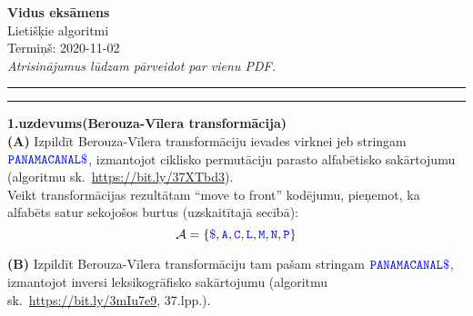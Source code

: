 \documentclass[a4paper,12pt]{article}
\begin{document}
\begin{center}
{\bf\Huge Vidus eksāmens} \\[5pt]
Lietišķie algoritmi \\
Termiņš: 2020-11-02\\[5pt]
{\em Atrisinājumus lūdzam pārveidot par vienu PDF.}
\end{center}

\hrule
\vspace{2pt}
\hrule
\vspace{12pt}



\vspace{10pt}
{\bf 1.uzdevums(Berouza-Vīlera trans\-for\-mā\-ci\-ja)}\\
{\bf (A)} Izpildīt Berouza-Vīlera transformāciju ie\-va\-des virknei jeb stringam
$\textcolor{blue}{\mathtt{PANAMACANAL\$}}$, izmantojot 
ciklisko permutāciju parasto alfabētisko sakārtojumu 
(algoritmu sk.\ \url{https://bit.ly/37XTbd3}).\\
Veikt transformācijas rezultātam ``move to front'' kodējumu, 
pieņemot, ka alfabēts satur sekojošos burtus (uzskaitītajā secībā): 
$$\mathcal{A}=\{\textcolor{blue}{\mathtt{\$}},\textcolor{blue}{\mathtt{A}},\textcolor{blue}{\mathtt{C}},
\textcolor{blue}{\mathtt{L}},\textcolor{blue}{\mathtt{M}},\textcolor{blue}{\mathtt{N}},\textcolor{blue}{\mathtt{P}} \}$$

{\bf (B)} Izpildīt Berouza-Vīlera transformāciju tam pa\-šam stringam 
$\textcolor{blue}{\mathtt{PANAMACANAL\$}}$, izmantojot inversi leksikogrāfisko sakārtojumu 
(algoritmu sk.\ \url{https://bit.ly/3mIu7e9}, 37.lpp.). 
\end{document}
